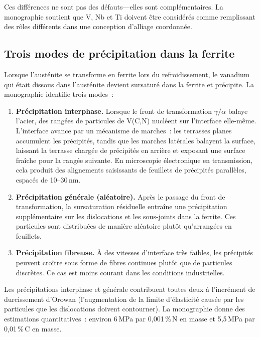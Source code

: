 \documentclass[11pt,a4paper]{article}
\begin{document}
Ces diff\'erences ne sont pas des d\'efauts---elles sont
compl\'ementaires.  La monographie soutient que V, Nb et Ti doivent
\^etre consid\'er\'es comme remplissant des r\^oles diff\'erents dans
une conception d'alliage coordonn\'ee.

\subsection{Trois modes de pr\'ecipitation dans la ferrite}

Lorsque l'aust\'enite se transforme en ferrite lors du refroidissement,
le vanadium qui \'etait dissous dans l'aust\'enite devient sursatur\'e
dans la ferrite et pr\'ecipite.  La monographie identifie trois modes~:

\begin{enumerate}
  \item \textbf{Pr\'ecipitation interphase.}  Lorsque le front de
    transformation $\gamma/\alpha$ balaye l'acier, des rang\'ees de
    particules de V(C,N) nucl\'eent sur l'interface elle-m\^eme.
    L'interface avance par un m\'ecanisme de marches~: les terrasses
    planes accumulent les pr\'ecipit\'es, tandis que les marches
    lat\'erales balayent la surface, laissant la terrasse charg\'ee de
    pr\'ecipit\'es en arri\`ere et exposant une surface fra\^iche pour
    la rang\'ee suivante.  En microscopie \'electronique en transmission,
    cela produit des alignements saisissants de feuillets de
    pr\'ecipit\'es parall\`eles, espac\'es de 10--30\,nm.

  \item \textbf{Pr\'ecipitation g\'en\'erale (al\'eatoire).}  Apr\`es le
    passage du front de transformation, la sursaturation r\'esiduelle
    entra\^ine une pr\'ecipitation suppl\'ementaire sur les dislocations
    et les sous-joints dans la ferrite.  Ces particules sont distribu\'ees
    de mani\`ere al\'eatoire plut\^ot qu'arrang\'ees en feuillets.

  \item \textbf{Pr\'ecipitation fibreuse.}  \`A des vitesses d'interface
    tr\`es faibles, les pr\'ecipit\'es peuvent cro\^itre sous forme de
    fibres continues plut\^ot que de particules discr\`etes.  Ce cas est
    moins courant dans les conditions industrielles.
\end{enumerate}

Les pr\'ecipitations interphase et g\'en\'erale contribuent toutes deux
\`a l'incr\'ement de durcissement d'Orowan (l'augmentation de la limite
d'\'elasticit\'e caus\'ee par les particules que les dislocations doivent
contourner).  La monographie donne des estimations quantitatives~:
environ 6\,MPa par 0,001\,\%\,N en masse et 5,5\,MPa par 0,01\,\%\,C
en masse.
\end{document}
